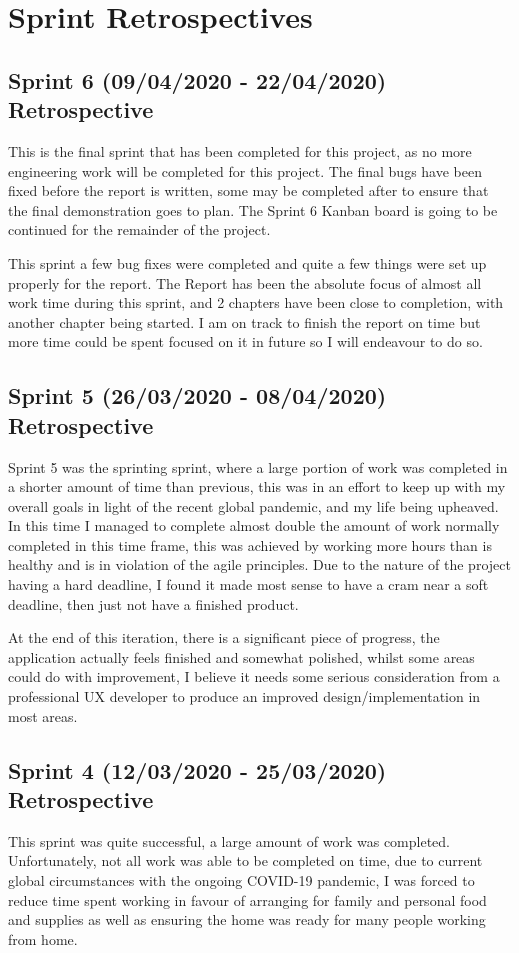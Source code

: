 \chapter{Sprint Retrospectives} \label {SRINTRETROSPECTIVES}

\section{Sprint 6 (09/04/2020 - 22/04/2020) Retrospective}
This is the final sprint that has been completed for this project, as no more engineering work will be completed for this project. The final bugs have been fixed before the report is written, some may be completed after to ensure that the final demonstration goes to plan. The Sprint 6 Kanban board is going to be continued for the remainder of the project. 

This sprint a few bug fixes were completed and quite a few things were set up properly for the report. The Report has been the absolute focus of almost all work time during this sprint, and 2 chapters have been close to completion, with another chapter being started. I am on track to finish the report on time but more time could be spent focused on it in future so I will endeavour to do so.

\section{Sprint 5 (26/03/2020 - 08/04/2020) Retrospective}
Sprint 5 was the sprinting sprint, where a large portion of work was completed in a shorter amount of time than previous, this was in an effort to keep up with my overall goals in light of the recent global pandemic, and my life being upheaved. In this time I managed to complete almost double the amount of work normally completed in this time frame, this was achieved by working more hours than is healthy and is in violation of the agile principles. Due to the nature of the project having a hard deadline, I found it made most sense to have a cram near a soft deadline, then just not have a finished product.

At the end of this iteration, there is a significant piece of progress, the application actually feels finished and somewhat polished, whilst some areas could do with improvement, I believe it needs some serious consideration from a professional UX developer to produce an improved design/implementation in most areas.

\section{Sprint 4 (12/03/2020 - 25/03/2020) Retrospective}
This sprint was quite successful, a large amount of work was completed. Unfortunately, not all work was able to be completed on time, due to current global circumstances with the ongoing COVID-19 pandemic, I was forced to reduce time spent working in favour of arranging for family and personal food and supplies as well as ensuring the home was ready for many people working from home.

